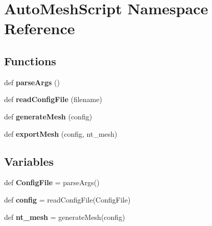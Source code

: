 \hypertarget{a00212}{}\section{Auto\+Mesh\+Script Namespace Reference}
\label{a00212}
\subsection*{Functions}
\begin{DoxyCompactItemize}
\item 
\mbox{\label{a00212_aa090dbc02ad95bb768f3a5326c4c7226}} 
def {\bfseries parse\+Args} ()
\item 
\mbox{\label{a00212_a1618090c4949f9c4a845e1507399afec}} 
def {\bfseries read\+Config\+File} (filename)
\item 
\mbox{\label{a00212_a9da87c990f4ddc09e81607abdf716313}} 
def {\bfseries generate\+Mesh} (config)
\item 
\mbox{\label{a00212_a28feba28256994269d5a146f009c82ba}} 
def {\bfseries export\+Mesh} (config, nt\+\_\+mesh)
\end{DoxyCompactItemize}
\subsection*{Variables}
\begin{DoxyCompactItemize}
\item 
\mbox{\label{a00212_aeae3cac80da4d993af8e9ae5783ff026}} 
def {\bfseries Config\+File} = parse\+Args()
\item 
\mbox{\label{a00212_aa4f3f4c4f5bb531d5f65bc0519b608c8}} 
def {\bfseries config} = read\+Config\+File(Config\+File)
\item 
\mbox{\label{a00212_a0629203d8324604eedf0ff7dc22c2c49}} 
def {\bfseries nt\+\_\+mesh} = generate\+Mesh(config)
\end{DoxyCompactItemize}


